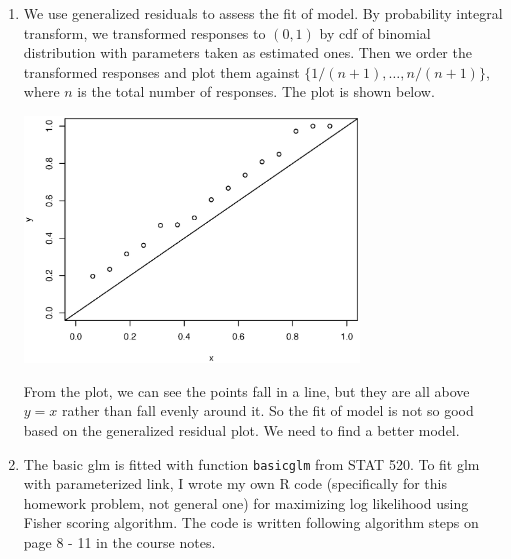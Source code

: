 \documentclass{article}
\begin{document}
\begin{enumerate}[leftmargin = 0 em, label = \arabic*., font = \bfseries]
      \item 
      We use generalized residuals to assess the fit of model. By probability integral transform, we transformed responses to $(0,1)$ by cdf of binomial distribution with parameters taken as estimated ones. Then we order the transformed responses and plot them against $\{1/(n+1), \ldots, n/(n+1)\}$, where $n$ is the total number of responses. The plot is shown below.
      \begin{center}
      	\includegraphics[width = 0.7\textwidth]{residual.eps}
      \end{center}

      From the plot, we can see the points fall in a line, but they are all above $y = x$ rather than fall evenly around it. So the fit of model is not so good based on the generalized residual plot. We need to find a better model.


      \item 
      The basic glm is fitted with function \verb|basicglm| from STAT 520. To fit glm with parameterized link, I wrote my own R code (specifically for this homework problem, not general one) for maximizing log likelihood using Fisher scoring algorithm. The code is written following algorithm steps on page 8 - 11 in the course notes.

 	\end{enumerate}






	
	
	
	
\end{document}
